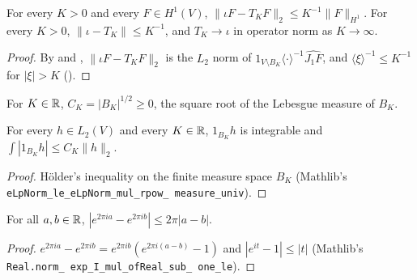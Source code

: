 \begin{proposition}
\label{prop:frequency-truncation-error}
\leanok
{}
For every $K > 0$ and every $F \in H^1(V)$, $\|\iota F - T_K F\|_2 \leq K^{-1} \|F\|_{H^1}$. For
every $K > 0$, $\|\iota - T_K\| \leq K^{-1}$, and $T_K \to \iota$ in operator norm as
$K \to \infty$.
\end{proposition}

\begin{proof}
\leanok
By  and , $\|\iota F - T_K F\|_2$ is the
$L_2$ norm of $1_{V \setminus B_K} \langle \cdot \rangle^{-1} \widehat{J_1 F}$, and
$\langle \xi \rangle^{-1} \leq K^{-1}$ for $|\xi| > K$ ().
\end{proof}

\begin{definition}
\label{def:ball-volume-sqrt}
\leanok
For $K \in \mathbb{R}$, $C_K = |B_K|^{1/2} \geq 0$, the square root of the Lebesgue measure of $B_K$.
\end{definition}

\begin{lemma}
\label{lem:cauchy-schwarz-ball}
\leanok
{}
For every $h \in L_2(V)$ and every $K \in \mathbb{R}$, $1_{B_K} h$ is integrable and
$\int |1_{B_K} h| \leq C_K \|h\|_2$.
\end{lemma}

\begin{proof}
\leanok
Hölder's inequality on the finite measure space $B_K$ (Mathlib's
\texttt{eLpNorm\_\allowbreak le\_\allowbreak eLpNorm\_\allowbreak mul\_\allowbreak rpow\_\allowbreak
measure\_\allowbreak univ}).
\end{proof}

\begin{lemma}
\label{lem:fourier-character-lipschitz}
\leanok
For all $a, b \in \mathbb{R}$, $|e^{2 \pi i a} - e^{2 \pi i b}| \leq 2 \pi |a - b|$.
\end{lemma}

\begin{proof}
\leanok
$e^{2 \pi i a} - e^{2 \pi i b} = e^{2 \pi i b}(e^{2 \pi i (a - b)} - 1)$ and
$|e^{i t} - 1| \leq |t|$ (Mathlib's \texttt{Real.\allowbreak norm\_\allowbreak
exp\_\allowbreak I\_\allowbreak mul\_\allowbreak ofReal\_\allowbreak sub\_\allowbreak
one\_\allowbreak le}).
\end{proof}


